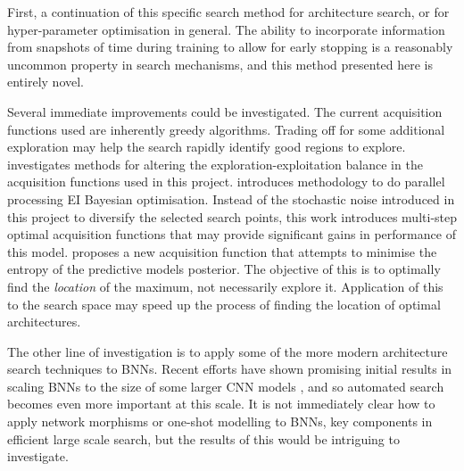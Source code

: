 First, a continuation of this specific search method for architecture search, or for hyper-parameter optimisation in general. The ability to incorporate information from snapshots of time during training to allow for early stopping is a reasonably uncommon property in search mechanisms, and this method presented here is entirely novel.

Several immediate improvements could be investigated. The current acquisition functions used are inherently greedy algorithms. Trading off for some additional exploration may help the search rapidly identify good regions to explore. \citet{Brochu2010a} investigates methods for altering the exploration-exploitation balance in the acquisition functions used in this project. \citet{Ginsbourger2008} introduces methodology to do parallel processing EI Bayesian optimisation. Instead of the stochastic noise introduced in this project to diversify the selected search points, this work introduces multi-step optimal acquisition functions that may provide significant gains in performance of this model. \citet{Hennig2012} proposes a new acquisition function that attempts to minimise the entropy of the predictive models posterior. The objective of this is to optimally find the \textit{location} of the maximum, not necessarily explore it. Application of this to the search space may speed up the process of finding the location of optimal architectures.

The other line of investigation is to apply some of the more modern architecture search techniques to BNNs. Recent efforts have	 shown promising initial results in scaling BNNs to the size of some larger CNN models \cite{Shridhar2018,richtalkBNNscale}, and so automated search becomes even more important at this scale. It is not immediately clear how to apply network morphisms or one-shot modelling to BNNs, key components in efficient large scale search, but the results of this would be intriguing to investigate.